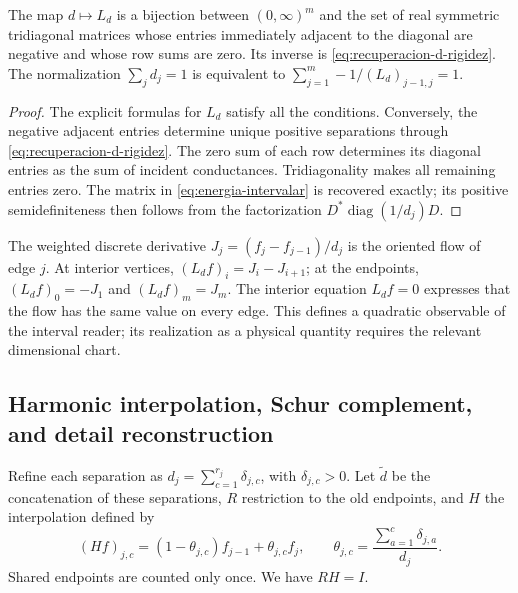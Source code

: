 \begin{proposition}
\label{prop:energia-bidireccional}
The map \(d\mapsto L_d\) is a bijection between
\((0,\infty)^m\) and the set of real symmetric tridiagonal matrices
whose entries immediately adjacent to the diagonal are negative and
whose row sums are zero. Its inverse is
\eqref{eq:recuperacion-d-rigidez}. The normalization
\(\sum_jd_j=1\) is equivalent to
\(\sum_{j=1}^m-1/(L_d)_{j-1,j}=1\).
\end{proposition}
\begin{proof}
The explicit formulas for \(L_d\) satisfy all the conditions.
Conversely, the negative adjacent entries determine unique positive
separations through \eqref{eq:recuperacion-d-rigidez}. The zero
sum of each row determines its diagonal entries as the sum of
incident conductances. Tridiagonality makes all remaining entries
zero. The matrix in \eqref{eq:energia-intervalar} is recovered
exactly; its positive semidefiniteness then follows from the
factorization \(D^*\operatorname{diag}(1/d_j)D\).
\end{proof}

The weighted discrete derivative \(J_j=(f_j-f_{j-1})/d_j\) is the
oriented flow of edge \(j\). At interior vertices,
\((L_df)_i=J_i-J_{i+1}\); at the endpoints,
\((L_df)_0=-J_1\) and \((L_df)_m=J_m\). The interior equation
\(L_df=0\) expresses that the flow has the same value on every edge.
This defines a quadratic observable of the interval reader;
its realization as a physical quantity requires the relevant dimensional chart.

\subsection{Harmonic interpolation, Schur complement, and detail reconstruction}

Refine each separation as
\(d_j=\sum_{c=1}^{r_j}\delta_{j,c}\), with \(\delta_{j,c}>0\).
Let \(\widetilde d\) be the concatenation of these separations,
\(R\) restriction to the old endpoints, and \(H\) the interpolation
defined by
\begin{equation}
 (Hf)_{j,c}=(1-\theta_{j,c})f_{j-1}+\theta_{j,c}f_j,
 \qquad
 \theta_{j,c}=\frac{\sum_{a=1}^c\delta_{j,a}}{d_j}.
 \label{eq:interpolacion-armonica-k}
\end{equation}
Shared endpoints are counted only once. We have \(RH=I\).

